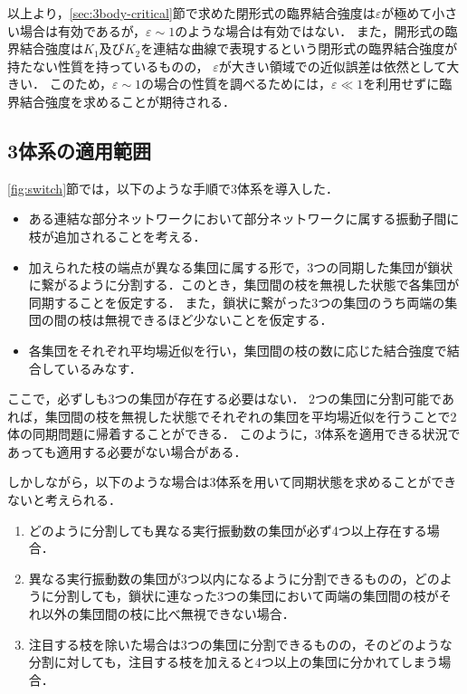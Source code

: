 \documentclass[../main]{subfiles}
\begin{document}
以上より，\ref{sec:3body-critical}節で求めた閉形式の臨界結合強度は$\varepsilon$が極めて小さい場合は有効であるが，$\varepsilon\sim 1$のような場合は有効ではない．
また，開形式の臨界結合強度は$K_1$及び$K_2$を連結な曲線で表現するという閉形式の臨界結合強度が持たない性質を持っているものの，
$\varepsilon$が大きい領域での近似誤差は依然として大きい．
このため，$\varepsilon\sim 1$の場合の性質を調べるためには，$\varepsilon\ll 1$を利用せずに臨界結合強度を求めることが期待される．

\subsection{3体系の適用範囲}
\label{sec:3body-application}
\ref{fig:switch}節では，以下のような手順で3体系を導入した．
\begin{itemize}
    \item ある連結な部分ネットワークにおいて部分ネットワークに属する振動子間に枝が追加されることを考える．
    \item 加えられた枝の端点が異なる集団に属する形で，3つの同期した集団が鎖状に繋がるように分割する．このとき，集団間の枝を無視した状態で各集団が同期することを仮定する．
    また，鎖状に繋がった3つの集団のうち両端の集団の間の枝は無視できるほど少ないことを仮定する．
    \item 各集団をそれぞれ平均場近似を行い，集団間の枝の数に応じた結合強度で結合しているみなす．
\end{itemize}
ここで，必ずしも3つの集団が存在する必要はない．
2つの集団に分割可能であれば，集団間の枝を無視した状態でそれぞれの集団を平均場近似を行うことで2体の同期問題に帰着することができる．
このように，3体系を適用できる状況であっても適用する必要がない場合がある．

しかしながら，以下のような場合は3体系を用いて同期状態を求めることができないと考えられる．
\renewcommand{\labelenumi}{Case \theenumi}
\begin{enumerate}
    \item \label{counter-case1} 
    どのように分割しても異なる実行振動数の集団が必ず4つ以上存在する場合．
    \item \label{counter-case2}
    異なる実行振動数の集団が3つ以内になるように分割できるものの，どのように分割しても，鎖状に連なった3つの集団において両端の集団間の枝がそれ以外の集団間の枝に比べ無視できない場合．
    \item \label{counter-case3}
    注目する枝を除いた場合は3つの集団に分割できるものの，そのどのような分割に対しても，注目する枝を加えると4つ以上の集団に分かれてしまう場合．
\end{enumerate}
\end{document}
